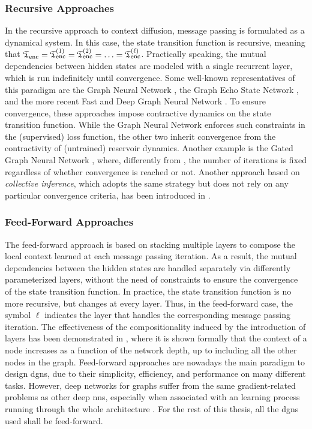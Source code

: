 \subsubsection*{Recursive Approaches}
In the recursive approach to context diffusion, message passing is formulated as a dynamical system. In this case, the state transition function is recursive, meaning that $\mathfrak{T}_{\mathrm{enc}} = \mathfrak{T}_{\mathrm{enc}}^{(1)} = \mathfrak{T}_{\mathrm{enc}}^{(2)} = \ldots = \mathfrak{T}_{\mathrm{enc}}^{(\ell)}$. Practically speaking, the mutual dependencies between hidden states are modeled with a single recurrent layer, which is run indefinitely until convergence. Some well-known representatives of this paradigm are the Graph Neural Network \citep{scarselli2009gnn}, the Graph Echo State Network \citep{gallicchio2010graphesn}, and the more recent Fast and Deep Graph Neural Network \citep{gallicchio2020fastdeepgnn}. To ensure convergence, these approaches impose contractive dynamics on the state transition function. While the Graph Neural Network enforces such constraints in the (supervised) loss function, the other two inherit convergence from the contractivity of (untrained) reservoir dynamics. Another example is the Gated Graph Neural Network \citep{li2016gatedgnn}, where, differently from \citep{scarselli2009gnn}, the number of iterations is fixed \apriori regardless of whether convergence is reached or not. Another approach based on \emph{collective inference}, which adopts the same strategy but does not rely on any particular convergence criteria, has been introduced in \citep{macskassy2007classificationnetworkdata}.

\subsubsection*{Feed-Forward Approaches}
The feed-forward approach is based on stacking multiple layers to compose the local context learned at each message passing iteration. As a result, the mutual dependencies between the hidden states are handled separately via differently parameterized layers, without the need of constraints to ensure the convergence of the state transition function. In practice, the state transition function is no more recursive, but changes at every layer. Thus, in the feed-forward case, the symbol $\ell$ indicates the layer that handles the corresponding message passing iteration. The effectiveness of the compositionality induced by the introduction of layers has been demonstrated in \citep{micheli2009nn4g}, where it is shown formally that the context of a node increases as a function of the network depth, up to including all the other nodes in the graph. Feed-forward approaches are nowadays the main paradigm to design \glspl{dgn}, due to their simplicity, efficiency, and performance on many different tasks. However, deep networks for graphs suffer from the same gradient-related problems as other deep \glspl{nn}, especially when associated with an  learning process running through the whole architecture \citep{bengio1994learninglongtermdependenciesdifficult,li2018deeperinsightgraphconvsemisupervised}. For the rest of this thesis, all the \glspl{dgn} used shall be feed-forward.

